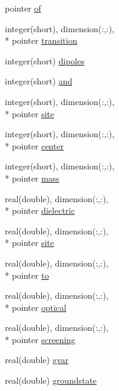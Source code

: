 \begin{DoxyCompactItemize}
pointer \hyperlink{structdipoles__class_1_1dipoles_ae6c47d2cab7825bb83f85b624a3acb17}{of}
\item 
integer(short), dimension(\+:,\+:), \\*
pointer \hyperlink{structdipoles__class_1_1dipoles_a0b9e590823522c87bb16a014777bc66e}{transition}
\item 
integer(short) \hyperlink{structdipoles__class_1_1dipoles_a2e2a7912feab61f030584442c17fd64b}{dipoles}
\item 
integer(short) \hyperlink{structdipoles__class_1_1dipoles_a7009b45719053d38b8b082f1505127cd}{and}
\item 
integer(short), dimension(\+:,\+:), \\*
pointer \hyperlink{structdipoles__class_1_1dipoles_ae35c528d0361b9cd3c1825567339acff}{site}
\item 
integer(short), dimension(\+:,\+:), \\*
pointer \hyperlink{structdipoles__class_1_1dipoles_a959e48d8726c84ad96695f27f5a324df}{center}
\item 
integer(short), dimension(\+:,\+:), \\*
pointer \hyperlink{structdipoles__class_1_1dipoles_a30387a2e38cdc8fac3440fb019fa39e4}{mass}
\item 
real(double), dimension(\+:,\+:), \\*
pointer \hyperlink{structdipoles__class_1_1dipoles_a669f75c4c95efa1ea721ba8aa7f785d3}{dielectric}
\item 
real(double), dimension(\+:,\+:), \\*
pointer \hyperlink{structdipoles__class_1_1dipoles_a195b04ed4976581c965eb24b155dee4b}{site}
\item 
real(double), dimension(\+:,\+:), \\*
pointer \hyperlink{structdipoles__class_1_1dipoles_aa236248648a049967f193ec7a2e721a3}{to}
\item 
real(double), dimension(\+:,\+:), \\*
pointer \hyperlink{structdipoles__class_1_1dipoles_a7a0b0cffbbb4e48c4bced86e3684ac14}{optical}
\item 
real(double), dimension(\+:,\+:), \\*
pointer \hyperlink{structdipoles__class_1_1dipoles_a353f22dda5068231a14e388b11f2c5cc}{screening}
\item 
real(double) \hyperlink{structdipoles__class_1_1dipoles_a6723a79a10a1b02fe363c2fdf8d0b1aa}{gvar}
\item 
real(double) \hyperlink{structdipoles__class_1_1dipoles_a0ad3fc4bf8e3d48aea2e39d709e5f4ca}{groundstate}

\end{DoxyCompactItemize}
